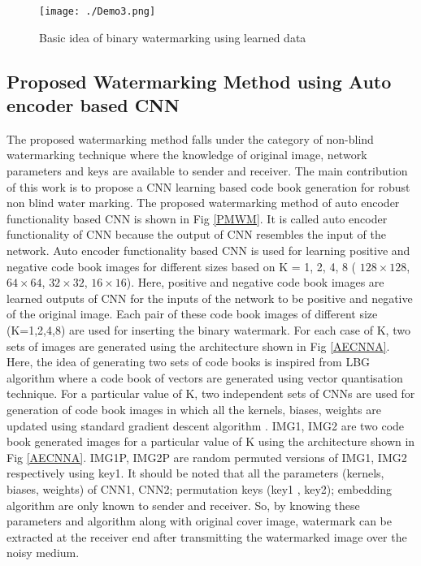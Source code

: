 \begin{figure*}
\centering
\texttt{[image: ./Demo3.png]}
\caption{Basic idea of binary watermarking using learned data}
\label{FIG:Demo3}

\end{figure*}

\subsection{Proposed Watermarking Method using Auto encoder based CNN}
The proposed watermarking method falls under the category of non-blind watermarking technique where the knowledge of original image, network parameters and keys are available to sender and receiver. The main contribution of this work is to propose a CNN learning based code book generation for robust non blind water marking. The proposed watermarking method of auto encoder functionality based CNN is shown in Fig \ref{PMWM}. It is called auto encoder functionality of CNN because the output of CNN resembles the input of the network. Auto encoder functionality based CNN is used for learning positive and negative code book images for different sizes based on K = 1, 2, 4, 8 ( $128\times128$, $64\times64$, $32\times32$, $16\times16$). Here, positive and negative code book images are learned outputs of CNN for the inputs of the network to be positive and negative of the original image. Each pair of these code book images of different size (K=1,2,4,8) are used for inserting the binary watermark. For each case of K, two sets of images are generated using the architecture shown in Fig \ref{AECNNA}. Here, the idea of generating two sets of code books is inspired from LBG algorithm \cite{P13} where a code book of vectors are generated using vector quantisation technique. For a particular value of K, two independent sets of CNNs are used for generation of code book images in which all the kernels, biases, weights are updated using standard gradient descent algorithm \cite{P14}. IMG1, IMG2 are two code book generated images for a particular value of K using the architecture shown in Fig \ref{AECNNA}. IMG1P, IMG2P  are random permuted versions of IMG1, IMG2 respectively using key1. It should be noted that all the parameters (kernels, biases, weights) of CNN1, CNN2; permutation keys (key1 , key2); embedding algorithm are only known to sender and receiver. So, by knowing these parameters and algorithm along with original cover image, watermark can be extracted at the receiver end after transmitting the watermarked image over the noisy medium.\\
 
